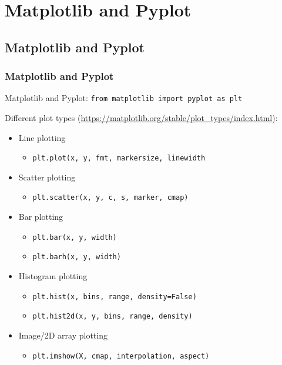 \documentclass{beamer}
\newcommand{\code}[1]{\texttt{#1}}
\begin{document}
\section{Matplotlib and Pyplot}

\begin{frame}	
\end{frame}

\subsection{Matplotlib and Pyplot}

\begin{frame}	
	\frametitle{Matplotlib and Pyplot}
	
	\begin{block}{Matplotlib and Pyplot:}
		\scriptsize
		\code{from matplotlib import pyplot as plt}
		
		\vspace{10pt}
		Different plot types (\url{https://matplotlib.org/stable/plot_types/index.html}):
		\begin{itemize}
			\scriptsize
			\setlength{\itemsep}{-2pt}
			\item Line plotting
				\begin{itemize}
					\scriptsize
					\item \texttt{plt.plot(x, y, fmt, markersize, linewidth} \\
				\end{itemize}
			\item Scatter plotting
				\begin{itemize}
					\scriptsize
					\item \texttt{plt.scatter(x, y, c, s, marker, cmap)} \\
				\end{itemize}
			\item Bar plotting
				\begin{itemize}
					\scriptsize
					\item \texttt{plt.bar(x, y, width)} \\
					\item \texttt{plt.barh(x, y, width)} \\
				\end{itemize}
			\item Histogram plotting
				\begin{itemize}
					\scriptsize
					\item \texttt{plt.hist(x, bins, range, density=False)}
					\item \texttt{plt.hist2d(x, y, bins, range, density)}
				\end{itemize}
			\item Image/2D array plotting
				\begin{itemize}
					\scriptsize
					\item \texttt{plt.imshow(X, cmap, interpolation, aspect)}
				\end{itemize}
		\end{itemize}
		

\end{block}
\end{frame}
\end{document}
